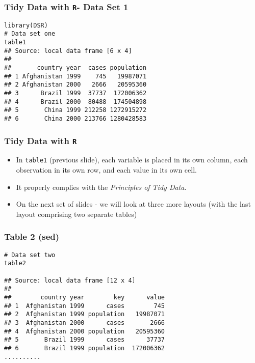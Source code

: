 \documentclass[TIDYMASTER.tex]{subfiles}
\begin{document}
\begin{frame}[fragile]
	\frametitle{Tidy Data with \texttt{R}- Data Set 1}
	\large
\begin{framed}
\begin{verbatim}
library(DSR)
# Data set one
table1
## Source: local data frame [6 x 4]
## 
##       country year  cases population
## 1 Afghanistan 1999    745   19987071
## 2 Afghanistan 2000   2666   20595360
## 3      Brazil 1999  37737  172006362
## 4      Brazil 2000  80488  174504898
## 5       China 1999 212258 1272915272
## 6       China 2000 213766 1280428583
\end{verbatim}
\end{framed}
\end{frame}
\begin{frame}[fragile]
	\frametitle{Tidy Data with \texttt{R}}
	\Large
	\vspace{-1cm}
	\begin{itemize}
		\item In \texttt{table1} (previous slide), each variable is placed in its own column, each observation in its own row, and each value in its own cell.
		\item It properly complies with the \textit{Principles of Tidy Data}. \bigskip
		\item On the next set of slides - we will look at three more layouts (with the last layout comprising two separate tables)
		
	\end{itemize}
	
\end{frame}
\begin{frame}[fragile]
	\frametitle{Table 2 (sed)}
	\large
	\begin{framed}
		\begin{verbatim}
# Data set two
table2

## Source: local data frame [12 x 4]
## 
##        country year        key      value
## 1  Afghanistan 1999      cases        745
## 2  Afghanistan 1999 population   19987071
## 3  Afghanistan 2000      cases       2666
## 4  Afghanistan 2000 population   20595360
## 5       Brazil 1999      cases      37737
## 6       Brazil 1999 population  172006362
..........
\end{verbatim}
\end{framed}
\end{frame}
\end{document}

